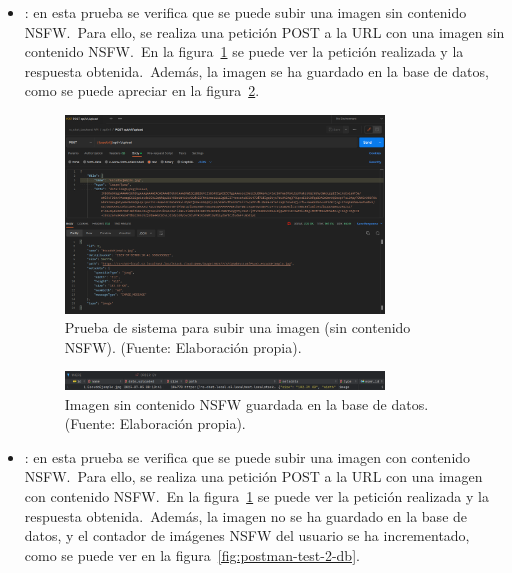 \begin{itemize}
	\item {}: en esta prueba se verifica que se puede subir una imagen
	sin contenido NSFW.\ Para ello, se realiza una petición POST a la URL  con
	una imagen sin contenido NSFW.\ En la figura~\ref{fig:postman-test-1} se puede ver la petición
	realizada y la respuesta obtenida.\ Además, la imagen se ha guardado en la base de datos, como se puede apreciar
	en la figura~\ref{fig:postman-test-1-db}.

	\begin{figure}[H]
		\centering
		\includegraphics[width=0.8\textwidth]{res/images/postman-system-test-upload-image-no-nsfw}
		\caption{Prueba de sistema para subir una imagen (sin contenido NSFW). (Fuente: Elaboración propia).}
		\label{fig:postman-test-1}
	\end{figure}

	\begin{figure}[H]
		\centering
		\includegraphics[width=0.8\textwidth]{res/images/postman-system-test-upload-image-no-nsfw-db}
		\caption{Imagen sin contenido NSFW guardada en la base de datos. (Fuente: Elaboración propia).}
		\label{fig:postman-test-1-db}
	\end{figure}

	\item {}: en esta prueba se verifica que  se puede
	subir una imagen con contenido NSFW.\ Para ello, se realiza una petición POST a la URL
	 con una imagen con contenido NSFW.\ En la figura~\ref{fig:postman-test-1} se
	puede ver la petición realizada y la respuesta obtenida.\ Además, la imagen no se ha guardado en la base de datos,
	y el contador de imágenes NSFW del usuario se ha incrementado, como se puede ver en la
	figura~\ref{fig:postman-test-2-db}.


\end{itemize}
